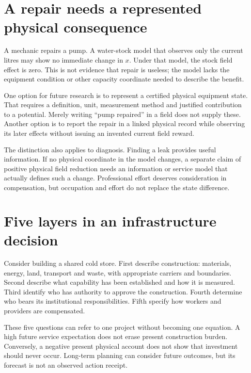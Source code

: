 
\section{A repair needs a represented physical consequence}
A mechanic repairs a pump. A water-stock model that observes only the current litres may show no immediate change in $x$. Under that model, the stock field effect is zero. This is not evidence that repair is useless; the model lacks the equipment condition or other capacity coordinate needed to describe the benefit.

One option for future research is to represent a certified physical equipment state. That requires a definition, unit, measurement method and justified contribution to a potential. Merely writing ``pump repaired'' in a field does not supply these. Another option is to report the repair in a linked physical record while observing its later effects without issuing an invented current field reward.

The distinction also applies to diagnosis. Finding a leak provides useful information. If no physical coordinate in the model changes, a separate claim of positive physical field reduction needs an information or service model that actually defines such a change. Professional effort deserves consideration in compensation, but occupation and effort do not replace the state difference.

\section{Five layers in an infrastructure decision}
Consider building a shared cold store. First describe construction: materials, energy, land, transport and waste, with appropriate carriers and boundaries. Second describe what capability has been established and how it is measured. Third identify who has authority to approve the construction. Fourth determine who bears its institutional responsibilities. Fifth specify how workers and providers are compensated.

These five questions can refer to one project without becoming one equation. A high future service expectation does not erase present construction burden. Conversely, a negative present physical account does not show that investment should never occur. Long-term planning can consider future outcomes, but its forecast is not an observed action receipt.

